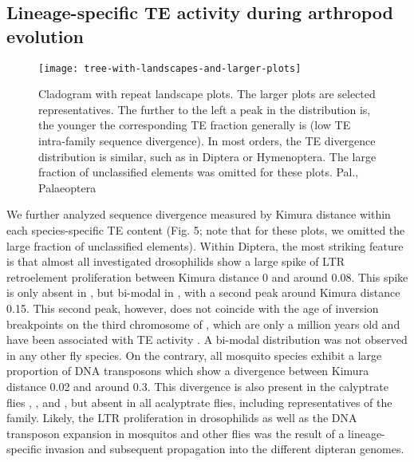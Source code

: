 \subsection{Lineage-specific TE activity during arthropod
evolution}\label{lineage-specific-te-activity-during-arthropod-evolution}

\begin{figure}[h!]
\begin{center}
\texttt{[image: tree-with-landscapes-and-larger-plots]}
\caption[Arthropod repeat landscapes]{{Cladogram with repeat landscape
plots. The larger plots are selected representatives. The further to the
left a peak in the distribution is, the younger the corresponding TE
fraction generally is (low TE intra-family sequence divergence). In most
orders, the TE divergence distribution is similar, such as in Diptera or
Hymenoptera. The large fraction of unclassified elements was omitted for
these plots. Pal., Palaeoptera%
}}
\end{center}
\end{figure}

We further analyzed sequence divergence measured by Kimura distance
within each species-specific TE content (Fig. 5; note that for these
plots, we omitted the large fraction of unclassified elements). Within
Diptera, the most striking feature is that almost all investigated
drosophilids show a large spike of LTR retroelement proliferation
between Kimura distance 0 and around 0.08. This spike is only absent in
, but bi-modal in , with a
second peak around Kimura distance 0.15. This second peak, however, does
not coincide with the age of inversion breakpoints on the third
chromosome of , which are only a million years
old and have been associated with TE activity \citep{Wallace2011}. A
bi-modal distribution was not observed in any other fly species. On the
contrary, all mosquito species exhibit a large proportion of DNA
transposons which show a divergence between Kimura distance 0.02 and
around 0.3. This divergence is also present in the calyptrate flies
, , and
, but absent in all acalyptrate flies,
including representatives of the  family. Likely,
the LTR proliferation in drosophilids as well as the DNA transposon
expansion in mosquitos and other flies was the result of a
lineage-specific invasion and subsequent propagation into the different
dipteran genomes.



